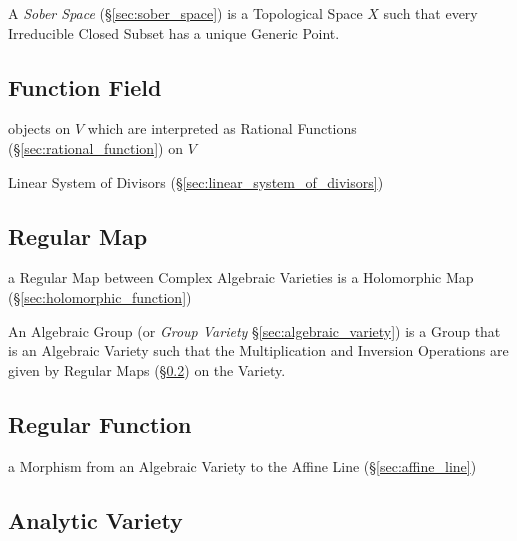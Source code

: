 \fist A \emph{Sober Space} (\S\ref{sec:sober_space}) is a Topological Space $X$
such that every Irreducible Closed Subset has a unique Generic Point.



\subsection{Function Field}\label{sec:function_field}

objects on $V$ which are interpreted as Rational Functions
(\S\ref{sec:rational_function}) on $V$

\fist Linear System of Divisors (\S\ref{sec:linear_system_of_divisors})



\subsection{Regular Map}\label{sec:regular_map}

a Regular Map between Complex Algebraic Varieties is a Holomorphic Map
(\S\ref{sec:holomorphic_function})

An Algebraic Group (or \emph{Group Variety} \S\ref{sec:algebraic_variety}) is a
Group that is an Algebraic Variety such that the Multiplication and Inversion
Operations are given by Regular Maps (\S\ref{sec:regular_map}) on the Variety.



\subsection{Regular Function}\label{sec:regular_function}

a Morphism from an Algebraic Variety to the Affine Line
(\S\ref{sec:affine_line})



\subsection{Analytic Variety}\label{sec:analytic_variety}


